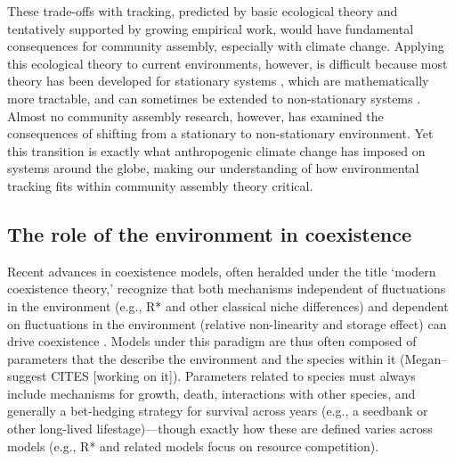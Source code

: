 \documentclass[11pt,letterpaper]{article}
\begin{document}
These trade-offs with tracking, predicted by basic ecological theory and tentatively supported by growing empirical work, would have fundamental consequences for community assembly, especially with climate change. Applying this ecological theory to current environments, however, is difficult because most theory has been developed for stationary systems \citep[as is the case in other sciences, ][]{Milly:2008yu}, which are mathematically more tractable, and can sometimes be extended to non-stationary systems \citep{chessonnonstat}. Almost no community assembly research, however, has examined the consequences of shifting from a stationary to non-stationary environment. Yet this transition is exactly what anthropogenic climate change has imposed on systems around the globe, making our understanding of how environmental tracking fits within community assembly theory critical. 



\subsection{The role of the environment in coexistence} %
Recent advances in coexistence models, often heralded under the title `modern coexistence theory,' recognize that both mechanisms independent of fluctuations in the environment (e.g., R* and other classical niche differences) and dependent on fluctuations in the environment (relative non-linearity and storage effect) can drive coexistence \citep{Chesson:1997dz,Chesson:2000vd}. Models under this paradigm are thus often composed of parameters that the describe the environment and the species within it (Megan--suggest CITES [working on it]). Parameters related to species must always include mechanisms for growth, death, interactions with other species, and generally a bet-hedging strategy for survival across years (e.g., a seedbank or other long-lived lifestage)---though exactly how these are defined varies across models (e.g., R* and related models focus on resource competition). 
\end{document}
